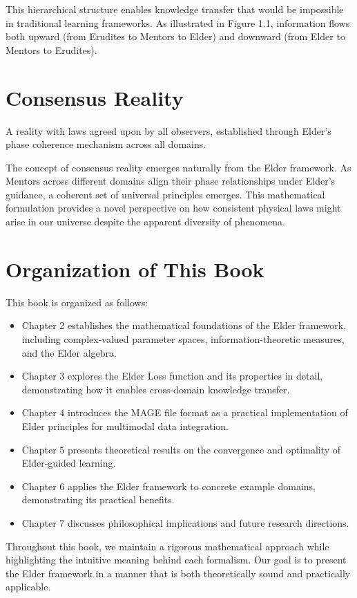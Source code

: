 This hierarchical structure enables knowledge transfer that would be impossible in traditional learning frameworks. As illustrated in Figure 1.1, information flows both upward (from Erudites to Mentors to Elder) and downward (from Elder to Mentors to Erudites).

\section{Consensus Reality}
\begin{definition}
A reality with laws agreed upon by all observers, established through Elder's phase coherence mechanism across all domains.
\end{definition}

The concept of consensus reality emerges naturally from the Elder framework. As Mentors across different domains align their phase relationships under Elder's guidance, a coherent set of universal principles emerges. This mathematical formulation provides a novel perspective on how consistent physical laws might arise in our universe despite the apparent diversity of phenomena.

\section{Organization of This Book}
This book is organized as follows:

\begin{itemize}
    \item Chapter 2 establishes the mathematical foundations of the Elder framework, including complex-valued parameter spaces, information-theoretic measures, and the Elder algebra.
    \item Chapter 3 explores the Elder Loss function and its properties in detail, demonstrating how it enables cross-domain knowledge transfer.
    \item Chapter 4 introduces the MAGE file format as a practical implementation of Elder principles for multimodal data integration.
    \item Chapter 5 presents theoretical results on the convergence and optimality of Elder-guided learning.
    \item Chapter 6 applies the Elder framework to concrete example domains, demonstrating its practical benefits.
    \item Chapter 7 discusses philosophical implications and future research directions.
\end{itemize}

Throughout this book, we maintain a rigorous mathematical approach while highlighting the intuitive meaning behind each formalism. Our goal is to present the Elder framework in a manner that is both theoretically sound and practically applicable.